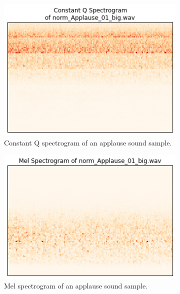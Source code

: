 \documentclass{sig-alternate-05-2015}
\begin{document}
  \begin{figure}[hbt]
    \centering
    \begin{subfigure}[b]{0.3\textwidth}
      \centering
      \includegraphics[width=\textwidth]{figures/cqt_applause.png}
      \caption{Constant Q spectrogram of an applause sound sample.}
      \label{fig:cqt-applause}
    \end{subfigure}
    \hfill 
    \begin{subfigure}[b]{0.3\textwidth}
      \centering
      \includegraphics[width=\textwidth]{figures/mel_applause.png}
      \caption{Mel spectrogram of an applause sound sample.}
      \label{fig:cqt-applause}
    \end{subfigure}
        \hfill 
    \begin{subfigure}[b]{0.3\textwidth}

\end{subfigure}
\end{figure}
\end{document}
